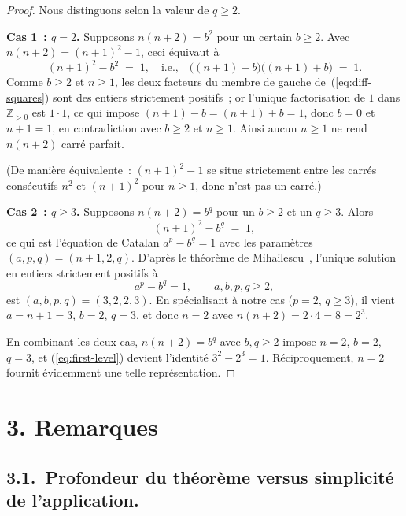 \documentclass[12pt,a4paper]{article}
\begin{document}
\begin{proof}
Nous distinguons selon la valeur de $q \geq 2$.

\medskip
\noindent\textbf{Cas 1~: $q = 2$.} Supposons $n(n+2) = b^2$ pour un certain
$b \geq 2$. Avec $n(n+2) = (n+1)^2 - 1$, ceci équivaut à
\begin{equation}
(n+1)^2 - b^2 \;=\; 1,
\quad\text{i.e.,}\quad
\bigl((n+1) - b\bigr)\bigl((n+1) + b\bigr) \;=\; 1.
\label{eq:diff-squares}
\end{equation}
Comme $b \geq 2$ et $n \geq 1$, les deux facteurs du membre de gauche
de~(\ref{eq:diff-squares}) sont des entiers strictement positifs~; or
l'unique factorisation de $1$ dans $\mathbb{Z}_{>0}$ est $1 \cdot 1$, ce qui
impose $(n+1) - b = (n+1) + b = 1$, donc $b = 0$ et $n + 1 = 1$, en
contradiction avec $b \geq 2$ et $n \geq 1$. Ainsi aucun $n \geq 1$ ne rend
$n(n+2)$ carré parfait.

(De manière équivalente~: $(n+1)^2 - 1$ se situe strictement entre les
carrés consécutifs $n^2$ et $(n+1)^2$ pour $n \geq 1$, donc n'est pas un
carré.)

\medskip
\noindent\textbf{Cas 2~: $q \geq 3$.} Supposons $n(n+2) = b^q$ pour un
$b \geq 2$ et un $q \geq 3$. Alors
\begin{equation}
(n+1)^2 - b^q \;=\; 1,
\label{eq:cat-shape}
\end{equation}
ce qui est l'équation de Catalan $a^p - b^q = 1$ avec les paramètres
$(a, p, q) = (n+1, 2, q)$. D'après le théorème de
Mihailescu~\cite{Mihailescu2004}, l'unique solution en entiers strictement
positifs à
\[
a^p - b^q = 1, \qquad a, b, p, q \geq 2,
\]
est $(a, b, p, q) = (3, 2, 2, 3)$. En spécialisant à notre cas
($p = 2$, $q \geq 3$), il vient $a = n+1 = 3$, $b = 2$, $q = 3$, et donc
$n = 2$ avec $n(n+2) = 2 \cdot 4 = 8 = 2^3$.

\medskip
En combinant les deux cas, $n(n+2) = b^q$ avec $b, q \geq 2$ impose
$n = 2$, $b = 2$, $q = 3$, et (\ref{eq:first-level}) devient l'identité
$3^2 - 2^3 = 1$. Réciproquement, $n = 2$ fournit évidemment une telle
représentation.
\end{proof}

\section*{3. Remarques}

\subsection*{3.1.\ Profondeur du théorème versus simplicité de l'application.}
\end{document}
